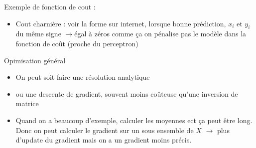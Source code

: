 \documentclass{article}
\theoremstyle{plain}%
\theoremstyle{definition}
\theoremstyle{remark}
\begin{document}
Exemple de fonction de cout :
\begin{itemize}
    \item Cout charnière : voir la forme sur internet, lorsque bonne prédiction, $x_i$ et $y_i$ du même signe $\rightarrow$égal à zéros comme ça on pénalise pas le modèle dans la fonction de coût (proche du perceptron)
\end{itemize}
Opimisation général 
\begin{itemize}
    \item On peut soit faire une résolution analytique
    \item ou une descente de gradient, souvent moins coûteuse qu'une inversion de matrice 
    \item Quand on a beaucoup d'exemple, calculer les moyennes ect ça peut être long. Donc on peut calculer le gradient sur un sous ensemble de $ X $ $\rightarrow$ plus d'update du gradient mais on a un gradient moins précis.
\end{itemize}
\end{document}
